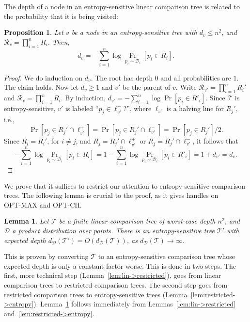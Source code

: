 \documentclass[letterpaper,11pt]{article}
\newtheorem{lemma}[theorem]{Lemma}
\newtheorem{prop}[theorem]{Proposition}
\newcommand{\OPTMAX}{\text{OPT-MAX}}
\newcommand{\OPTCH}{\text{OPT-CH}}
\newcommand{\cD}{\mathcal{D}}
\newcommand{\cR}{\mathcal{R}}
\newcommand{\cT}{\mathcal{T}}
\begin{document}
The depth of a node in an entropy-sensitive
linear comparison tree is related to the 
probability that it is being visited:

\begin{prop}\label{prop:entropyDepth}
  Let $v$ be a node in an entropy-sensitive 
  tree with $d_v \leq n^2$, and 
  $\cR_v = \prod_{i=1}^n R_i$.  Then, 
  \[
    d_v =  -\sum_{i=1}^n \log \Pr_{p_i \sim \cD_i}[p_i \in R_i].
  \]
\end{prop}

\begin{proof}
  We do induction on $d_v$. 
  The root has depth $0$ and all 
  probabilities are $1$. The claim 
  holds.  Now let $d_v \geq 1$ and 
  $v'$ be the parent of $v$. 
  Write $\cR_{v'} = \prod_{i=1}^n R_i'$ 
  and $\cR_{v} = \prod_{i=1}^n R_i$. 
  By induction, 
  $d_{v'} =  -\sum_{i=1}^n \log \Pr[p_i \in R'_i]$. 
  Since $\cT$ is entropy-sensitive, $v'$ is 
  labeled  ``$p_j \in \ell_{v'}^+$?'', 
  where  $\ell_{v'}$ is a halving line
  for $R_j'$, i.e.,
  \[
    \Pr[p_j \in R_j' \cap \ell_{v'}^+] = 
    \Pr[p_j \in R_j' \cap \ell_{v'}^-] = 
    \Pr[p_j \in R_j']/2.
  \]
  Since $R_i = R_i'$, for $i \neq j$, and 
  $R_j = R_j' \cap \ell_{v'}^+$ or 
  $R_j = R_j' \cap \ell_{v'}^-$,
  it follows that
  \[
    -\sum_{i=1}^n \log \Pr_{p_i \sim \cD_i}[p_i \in R_i]
    = 1-\sum_{i=1}^n \log \Pr_{p_i \sim \cD_i}[p_i \in R'_i]
    = 1+d_{v'} = d_v.
  \]
\end{proof}

We prove that it suffices to restrict our attention to entropy-sensitive comparison trees. 
The following lemma is crucial to the proof, as it gives handles on $\OPTMAX$ and $\OPTCH$.

\begin{lemma}\label{lem:lin->entropy}
  Let $\cT$ be a finite linear comparison 
  tree of worst-case depth $n^2$, and $\cD$ a product distribution over 
  points. There is an entropy-sensitive 
  tree $\cT'$ with expected depth 
  $d_{\cD}(\cT') = O(d_\cD(\cT))$, as 
  $d_\cD(\cT) \rightarrow\infty$.
\end{lemma}

This is proven by converting $\cT$ 
to an entropy-sensitive comparison 
tree whose expected depth is only 
a constant factor worse.  This is done in two steps. The first, more technical
step (Lemma~\ref{lem:lin->restricted}), goes from linear comparison trees to restricted comparison trees.
The second step goes from restricted comparison trees to entropy-sensitive trees (Lemma~\ref{lem:restricted->entropy}).
Lemma~\ref{lem:lin->entropy} follows immediately from Lemmas~\ref{lem:lin->restricted} and~\ref{lem:restricted->entropy}.
\end{document}
